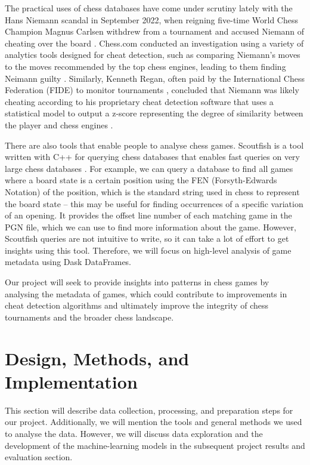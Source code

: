 \documentclass[a4paper, 11pt]{article}
\begin{document}
The practical uses of chess databases have come under scrutiny lately with the Hans Niemann scandal in September 2022, when reigning five-time World Chess Champion Magnus Carlsen withdrew from a tournament and accused Niemann of cheating over the board \cite{niemannCheatingAllegations2}. Chess.com conducted an investigation using a variety of analytics tools designed for cheat detection, such as comparing Niemann's moves to the moves recommended by the top chess engines, leading to them finding Neimann guilty \cite{niemannCheatingChessComReport}. Similarly, Kenneth Regan, often paid by the International Chess Federation (FIDE) to monitor tournaments \cite{niemannCheatingReganReport}, concluded that Niemann was likely cheating according to his proprietary cheat detection software that uses a statistical model to output a z-score representing the degree of similarity between the player and chess engines \cite{niemannCheatingReganReport}.

There are also tools that enable people to analyse chess games. Scoutfish is a tool written with C++ for querying chess databases that enables fast queries on very large chess databases \cite{scoutfish}. For example, we can query a database to find all games where a board state is a certain position using the FEN (Forsyth-Edwards Notation) of the position, which is the standard string used in chess to represent the board state -- this may be useful for finding occurrences of a specific variation of an opening. It provides the offset line number of each matching game in the PGN file, which we can use to find more information about the game. However, Scoutfish queries are not intuitive to write, so it can take a lot of effort to get insights using this tool. Therefore, we will focus on high-level analysis of game metadata using Dask DataFrames.

Our project will seek to provide insights into patterns in chess games by analysing the metadata of games, which could contribute to improvements in cheat detection algorithms and ultimately improve the integrity of chess tournaments and the broader chess landscape.

\section{Design, Methods, and Implementation}
This section will describe data collection, processing, and preparation steps for our project. Additionally, we will mention the tools and general methods we used to analyse the data. However, we will discuss data exploration and the development of the machine-learning models in the subsequent project results and evaluation section.
\end{document}
